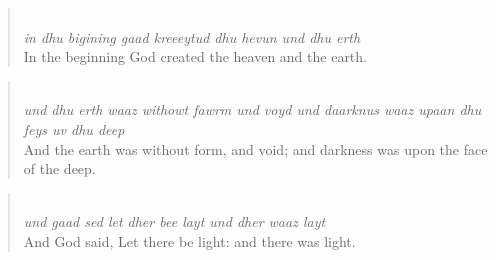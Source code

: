 \begin{quote}\noindent {}\\[1pt]
\textit{in dhu bigining gaad kreeeytud dhu hevun und dhu erth}\\[1pt]
In the beginning God created the heaven and the earth.
\end{quote}
\begin{quote}\noindent {}\\[1pt]
\textit{und dhu erth waaz withowt fawrm und voyd und daarknus waaz upaan dhu feys uv dhu deep}\\[1pt]
And the earth was without form, and void; and darkness was upon the face of the deep.
\end{quote}
\begin{quote}\noindent {}\\[1pt]
\textit{und gaad sed let dher bee layt und dher waaz layt}\\[1pt]
And God said, Let there be light: and there was light.
\end{quote}